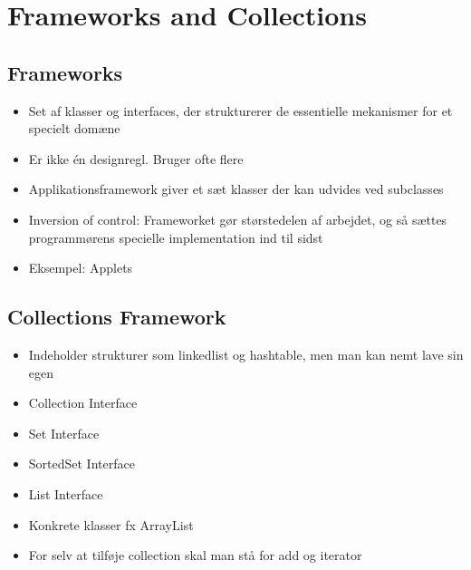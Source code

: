 \section{Frameworks and Collections} %
\label{sec:frameworks_and_collections}
\subsection{Frameworks} %
\label{sub:frameworks}
\begin{itemize}
    \item Set af klasser og interfaces, der strukturerer de essentielle mekanismer for et specielt domæne
    \item Er ikke én designregl. Bruger ofte flere
    \item Applikationsframework giver et sæt klasser der kan udvides ved subclasses
    \item Inversion of control: Frameworket gør størstedelen af arbejdet, og så sættes programmørens specielle implementation ind til sidst
    \item Eksempel: Applets
\end{itemize}
\subsection{Collections Framework} %
\label{sub:collections_framework}
\begin{itemize}
    \item Indeholder strukturer som linkedlist og hashtable, men man kan nemt lave sin egen
    \item Collection Interface
    \item Set Interface
    \item SortedSet Interface
    \item List Interface
    \item Konkrete klasser fx ArrayList
    \item For selv at tilføje collection skal man stå for add og iterator
\end{itemize}
